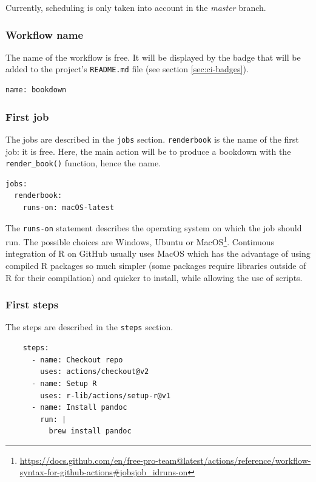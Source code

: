 \documentclass[
  12pt,
  american,
  a4paper,
  extrafontsizes,onecolumn,openright
  ]{memoir}
\begin{document}
Currently, scheduling is only taken into account in the \emph{master} branch.

\hypertarget{workflow-name}{%
\subsubsection{Workflow name}\label{workflow-name}}

The name of the workflow is free.
It will be displayed by the badge that will be added to the project's \texttt{README.md} file (see section \ref{sec:ci-badges}).

\begin{verbatim}
name: bookdown
\end{verbatim}

\hypertarget{first-job}{%
\subsubsection{First job}\label{first-job}}

The jobs are described in the \texttt{jobs} section.
\texttt{renderbook} is the name of the first job: it is free.
Here, the main action will be to produce a bookdown with the \texttt{render\_book()} function, hence the name.

\begin{verbatim}
jobs:
  renderbook:
    runs-on: macOS-latest
\end{verbatim}

The \texttt{runs-on} statement describes the operating system on which the job should run.
The possible choices are Windows, Ubuntu or MacOS\footnote{\url{https://docs.github.com/en/free-pro-team@latest/actions/reference/workflow-syntax-for-github-actions\#jobsjob_idruns-on}}.
Continuous integration of R on GitHub usually uses MacOS which has the advantage of using compiled R packages so much simpler (some packages require libraries outside of R for their compilation) and quicker to install, while allowing the use of scripts.

\hypertarget{first-steps}{%
\subsubsection{First steps}\label{first-steps}}

The steps are described in the \texttt{steps} section.

\begin{verbatim}
    steps:
      - name: Checkout repo
        uses: actions/checkout@v2
      - name: Setup R
        uses: r-lib/actions/setup-r@v1
      - name: Install pandoc
        run: |
          brew install pandoc
\end{verbatim}
\end{document}

